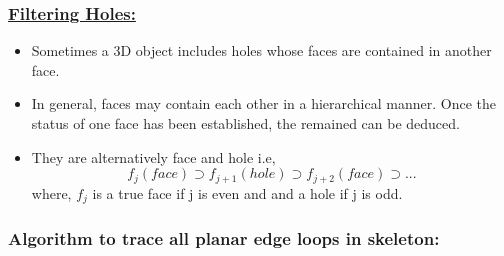\documentclass[12pt]{article}
\begin{document}
\subsubsection{\large{\underline{Filtering Holes:}}}

\begin{itemize}
    \item Sometimes a 3D object includes holes whose faces are contained in another face.
    \item In general, faces may contain each other in a hierarchical manner. Once the status of one face has been established, the remained can be deduced.
    \item They are alternatively face and hole i.e,
    $$ f_j (face) \supset f_{j+1} (hole) \supset f_{j+2} (face) \supset ...$$
    where, $f_j$ is a true face if j is even and and a hole if j is odd.
    
    
\end{itemize}

\pagebreak

\subsubsection{\large{Algorithm to trace all planar edge loops in skeleton:}}
\end{document}
